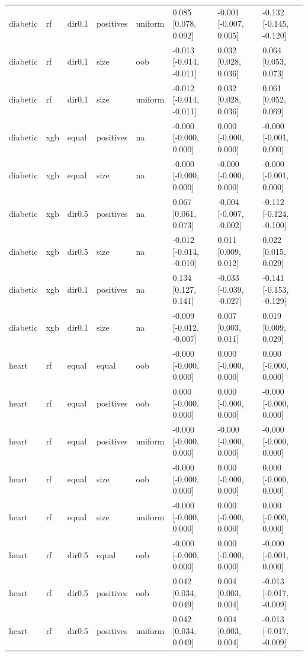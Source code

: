 \begin{tabular}{llllllll}
diabetic & rf & dir0.1 & positives & uniform & 0.085 [0.078, 0.092] & -0.001 [-0.007, 0.005] & -0.132 [-0.145, -0.120] \\
diabetic & rf & dir0.1 & size & oob & -0.013 [-0.014, -0.011] & 0.032 [0.028, 0.036] & 0.064 [0.053, 0.073] \\
diabetic & rf & dir0.1 & size & uniform & -0.012 [-0.014, -0.011] & 0.032 [0.028, 0.036] & 0.061 [0.052, 0.069] \\
diabetic & xgb & equal & positives & na & -0.000 [-0.000, 0.000] & 0.000 [-0.000, 0.000] & -0.000 [-0.001, 0.000] \\
diabetic & xgb & equal & size & na & -0.000 [-0.000, 0.000] & -0.000 [-0.000, 0.000] & -0.000 [-0.001, 0.000] \\
diabetic & xgb & dir0.5 & positives & na & 0.067 [0.061, 0.073] & -0.004 [-0.007, -0.002] & -0.112 [-0.124, -0.100] \\
diabetic & xgb & dir0.5 & size & na & -0.012 [-0.014, -0.010] & 0.011 [0.009, 0.012] & 0.022 [0.015, 0.029] \\
diabetic & xgb & dir0.1 & positives & na & 0.134 [0.127, 0.141] & -0.033 [-0.039, -0.027] & -0.141 [-0.153, -0.129] \\
diabetic & xgb & dir0.1 & size & na & -0.009 [-0.012, -0.007] & 0.007 [0.003, 0.011] & 0.019 [0.009, 0.029] \\
\addlinespace
heart & rf & equal & equal & oob & -0.000 [-0.000, 0.000] & 0.000 [-0.000, 0.000] & 0.000 [-0.000, 0.000] \\
heart & rf & equal & positives & oob & 0.000 [-0.000, 0.000] & 0.000 [-0.000, 0.000] & -0.000 [-0.000, 0.000] \\
heart & rf & equal & positives & uniform & -0.000 [-0.000, 0.000] & -0.000 [-0.000, 0.000] & -0.000 [-0.000, 0.000] \\
heart & rf & equal & size & oob & -0.000 [-0.000, 0.000] & 0.000 [-0.000, 0.000] & 0.000 [-0.000, 0.000] \\
heart & rf & equal & size & uniform & -0.000 [-0.000, 0.000] & 0.000 [-0.000, 0.000] & 0.000 [-0.000, 0.000] \\
heart & rf & dir0.5 & equal & oob & -0.000 [-0.000, 0.000] & 0.000 [-0.000, 0.000] & -0.000 [-0.001, 0.000] \\
heart & rf & dir0.5 & positives & oob & 0.042 [0.034, 0.049] & 0.004 [0.003, 0.004] & -0.013 [-0.017, -0.009] \\
heart & rf & dir0.5 & positives & uniform & 0.042 [0.034, 0.049] & 0.004 [0.003, 0.004] & -0.013 [-0.017, -0.009] \\

\end{tabular}

